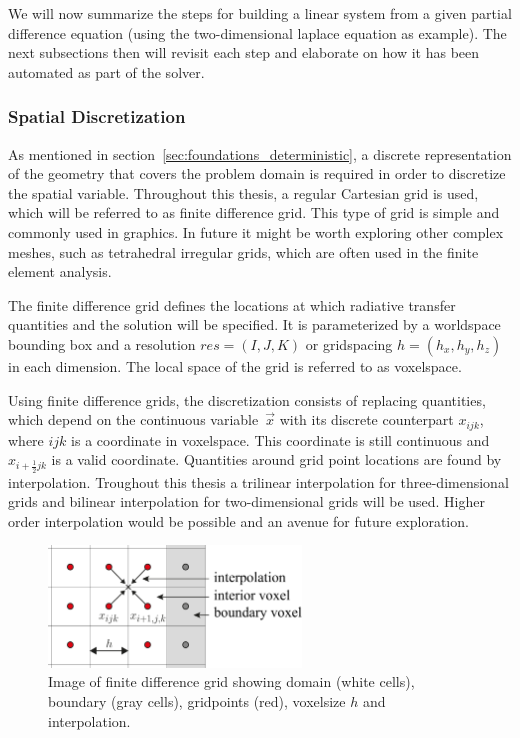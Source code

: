 We will now summarize the steps for building a linear system from a given partial difference equation (using the two-dimensional laplace equation as example). The next subsections then will revisit each step and elaborate on how it has been automated as part of the solver.

\subsubsection*{Spatial Discretization}

As mentioned in section~\ref{sec:foundations_deterministic}, a discrete representation of the geometry that covers the problem domain is required in order to discretize the spatial variable. Throughout this thesis, a regular Cartesian grid is used, which will be referred to as finite difference grid. This type of grid is simple and commonly used in graphics. In future it might be worth exploring other complex meshes, such as tetrahedral irregular grids, which are often used in the finite element analysis. 

The finite difference grid defines the locations at which radiative transfer quantities and the solution will be specified. It is parameterized by a worldspace bounding box and a resolution $res=(I,J,K)$ or gridspacing $h=(h_x, h_y, h_z)$ in each dimension. The local space of the grid is referred to as voxelspace.

Using finite difference grids, the discretization consists of replacing quantities, which depend on the continuous variable~$\vec{x}$ with its discrete counterpart $x_{ijk}$, where $ijk$ is a coordinate in voxelspace. This coordinate is still continuous and $x_{i+\frac{1}{2}jk}$ is a valid coordinate. Quantities around grid point locations are found by interpolation. Troughout this thesis a trilinear interpolation for three-dimensional grids and bilinear interpolation for two-dimensional grids will be used. Higher order interpolation would be possible and an avenue for future exploration.
\begin{figure}[h]
\centering
\includegraphics[width=0.6\textwidth]{04_pn_method/figures/fig_fd_grids.pdf}
\caption{Image of finite difference grid showing domain (white cells), boundary (gray cells), gridpoints (red), voxelsize $h$ and interpolation.}
\label{fig:pn_solver_finite_difference_grid}
\end{figure}

